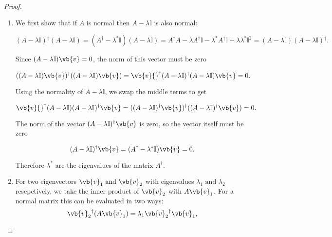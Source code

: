 \documentclass[a4paper,12pt]{report}
\begin{document}
\begin{proof}
\begin{enumerate}[label=(\(P\)\arabic*)]
    \item We first show that if \(A\) is normal then \(A - \lambda \mathbb{I}\) is also normal:
    
    \begin{equation}
        (A-\lambda \mathbb{I}){}^{\dagger} (A-\lambda \mathbb{I}) = (A^{\dagger} - \lambda ^*\mathbb{I})(A-\lambda \mathbb{I}) = A^{\dagger} A - \lambda A^{\dagger} \mathbb{I} - \lambda ^*A {}^{\dagger} \mathbb{I} + \lambda \lambda ^*\mathbb{I}^2 = (A-\lambda \mathbb{I})(A-\lambda \mathbb{I}){}^{\dagger}.
    \end{equation}
    
    Since \((A-\lambda \mathbb{I})\vb{v} = 0\), the norm of this vector must be zero
    
    \begin{equation}
        ((A-\lambda \mathbb{I})\vb{v} ){}^{\dagger} ((A-\lambda \mathbb{I})\vb{v} ) = \vb{v} {}^{\dagger} (A-\lambda \mathbb{I}){}^{\dagger} (A-\lambda \mathbb{I})\vb{v} =0.
    \end{equation}

    Using the normality of \(A-\lambda \mathbb{I}\), we swap the middle terms to get 

    \begin{equation}
        \vb{v} {}^{\dagger} (A-\lambda \mathbb{I})(A-\lambda \mathbb{I}){}^{\dagger} \vb{v} = ((A-\lambda \mathbb{I}){}^{\dagger} \vb{v} ){}^{\dagger} ((A-\lambda \mathbb{I}){}^{\dagger} \vb{v} ) = 0.
    \end{equation}
    
    The norm of the vector \((A-\lambda \mathbb{I}){}^{\dagger} \vb{v}\) is zero, so the vector itself must be zero

    \begin{equation}
        (A-\lambda \mathbb{I}){}^{\dagger} \vb{v} = (A^{\dagger} - \lambda ^*\mathbb{I})\vb{v} =0.
    \end{equation}

    Therefore \(\lambda ^*\) are the eigenvalues of the matrix \(A^{\dagger} \).  
    
    \item For two eigenvectors \(\vb{v} _{1} \text { and } \vb{v} _{2}  \) with eigenvalues \(\lambda _{1} \text { and } \lambda _{2}  \) resepctively, we take the inner product of \(\vb{v} _{2} \) with \(A \vb{v} _{1}  \). For a normal matrix this can be evaluated in two ways:
    \begin{equation}
        \vb{v} _{2} {}^{\dagger} (A\vb{v} _{1}) = \lambda _{1} \vb{v} _{2} {}^{\dagger}\vb{v} _{1},
    \end{equation}


\end{enumerate}
\end{proof}
\end{document}
